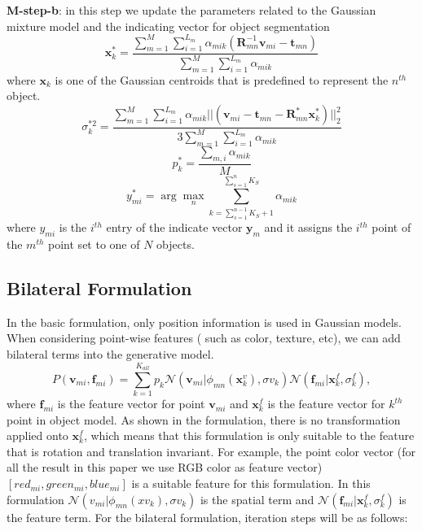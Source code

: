 \textbf{M-step-b}: in this step we update the parameters related to the Gaussian mixture model and the indicating vector for object segmentation 
\begin{equation}
\label{equ:updatexk}
\mathbf x_k^*=\frac{\sum_{m=1}^M\sum_{i=1}^{L_m}\alpha_{mik}(\mathbf{R}_{mn}^{-1}\mathbf{v}_{mi}-\mathbf t_{mn})}{\sum_{m=1}^M\sum_{i=1}^{L_m}\alpha_{mik}}
\end{equation}
where $\mathbf{x}_k$ is one of the Gaussian centroids that is predefined to represent the $n^{th}$ object. 
\begin{equation}
\label{equ:updatesigma}
\sigma_k^{*2}=\frac{\sum_{m=1}^M\sum_{i=1}^{L_m}\alpha_{mik}||(\mathbf{v}_{mi}-\mathbf t_{mn}-\mathbf{R}_{mn}^*\mathbf x_k^*)||_2^2}{3\sum_{m=1}^M\sum_{i=1}^{L_m}\alpha_{mik}}
\end{equation}
\begin{equation}
\label{equ:updatepk}
p_k^*=\frac{\sum_{m,i}\alpha_{mik}}{M}
\end{equation}
\begin{equation}
\label{equ:updatey}
y_{mi}^*=\arg \max_n \sum_{k=\sum_{s=1}^{n-1}K_S+1}^{\sum_{s=1}^{n}K_S} \alpha_{mik} 
\end{equation}
where $y_{mi}$ is the $i^{th}$ entry of the indicate vector $\mathbf{y}_{m}$ and it assigns the $i^{th}$ point of the $m^{th}$ point set to one of $N$ objects.  

\subsection{Bilateral Formulation}
\label{sec:bilateral-formulation}

In the basic formulation, only position information is used in Gaussian models.
When considering point-wise features ( such as color, texture, etc), we can add bilateral terms into the generative model.
\begin{equation}
P(\mathbf{v}_{mi},\mathbf{f}_{mi})=\sum^{K_{all}}_{k=1}p_k\mathcal{N}(\mathbf{v}_{mi}|\phi_{mn}(\mathbf{x}^v_k),\sigma v_k)\mathcal{N}(\mathbf{f}_{mi}|\mathbf{x}^f_k,\sigma^f_k),
\end{equation}
where $\mathbf{f}_{mi}$ is the feature vector for point $\mathbf{v}_{mi}$ and $\mathbf{x}_k^f$ is the feature vector for $k^{th}$ point in object model. As shown in the formulation, there is no transformation applied onto $\mathbf{x}_k^f$, which means that this formulation is only suitable to the feature that is rotation and translation invariant. For example, the point color vector (for all the result in this paper we use RGB color as feature vector) $[red_{mi},green_{mi},blue_{mi}]$ is a suitable feature for this formulation. In this formulation $\mathcal{N}(v_{mi}|\phi_{mn}(xv_k),\sigma v_k)$ is the spatial term and $\mathcal{N}(\mathbf{f}_{mi}|\mathbf{x}^f_k,\sigma^f_k)$ is the feature term.
For the bilateral formulation, iteration steps will be as follows:

